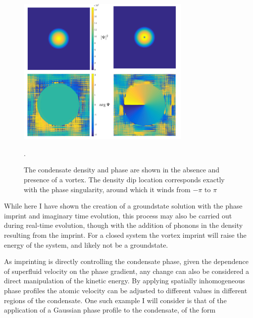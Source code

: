 \begin{figure}\centering
    \includegraphics[width=0.75\textwidth]{Images/ch4_vtx/1vtxbec.pdf}
    \caption{The condensate density and phase are shown in the absence and presence of a vortex. The density dip location corresponds exactly with the phase singularity, around which it winds from $-\pi$ to $\pi$}.\label{fig:0to1vtx}
\end{figure}
While here I have shown the creation of a groundstate solution with the phase imprint and imaginary time evolution, this process may also be carried out during real-time evolution, though with the addition of phonons in the density resulting from the imprint. For a closed system the vortex imprint will raise the energy of the system, and likely not be a groundstate.

As imprinting is directly controlling the condensate phase, given the dependence of superfluid velocity on the phase gradient, any change can also be considered a direct manipulation of the kinetic energy. By applying spatially inhomogeneous phase profiles the atomic velocity can be adjusted to different values in different regions of the condensate. One such example I will consider is that of the application of a Gaussian phase profile to the condensate, of the form


